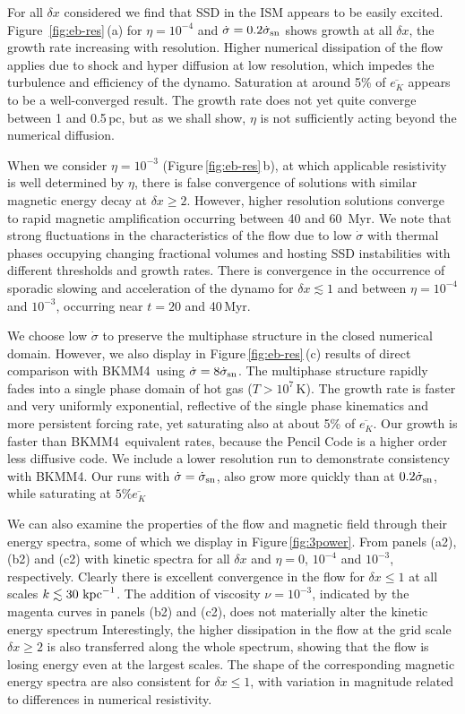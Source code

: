 \documentclass[preprint2]{aastex63}
\newcommand\SNr{\dot\sigma_{\rm sn}}
\newcommand\kpc{~ {\rm kpc}}
\newcommand\dx{ {\delta x}}
\newcommand\BKM{{\sf BKMM4}}
\newcommand{\fg}[1]{\textcolor{midgreen}{#1}}
\begin{document}
\fg{For all $\dx$ considered we find that SSD in the
 ISM appears to be easily excited.
 Figure~\ref{fig:eb-res}\,(a) for $\eta=10^{-4}$ and $\dot\sigma=0.2\SNr$
 shows growth at all $\dx$, the growth rate increasing with resolution.
 Higher numerical dissipation of the flow applies due to shock and hyper
 diffusion at low resolution, which impedes the turbulence and efficiency of
 the dynamo.
 Saturation at around 5\% of $\overline{e_K}$ appears to be a well-converged
 result.
 The growth rate does not yet quite converge between 1 and 0.5\,pc, but as we
 shall show, $\eta$ is not sufficiently acting beyond the numerical diffusion.}

 \fg{When we consider} $\eta=10^{-3}$ \fg{(Figure\,\ref{fig:eb-res}\,b), at which
 applicable resistivity is well determined by $\eta$,} there is false
 convergence
 \citep{FMA91} of solutions with similar magnetic energy decay at $\dx\geq2$.
 However, higher resolution solutions converge to rapid magnetic
 amplification occurring between 40 and 60~Myr.
 \fg{We note that strong fluctuations in the characteristics of the flow due to
 low $\dot\sigma$ with thermal phases occupying changing fractional volumes
 \citep[e.g.][]{gatto2015} and hosting SSD instabilities with different 
 thresholds and growth rates.
 There is convergence in the occurrence of sporadic slowing and acceleration
 of the dynamo for $\dx\lesssim1$ and between $\eta=10^{-4}$ and $10^{-3}$,
 occurring near $t=20$ and 40\,Myr.
 }
  
 \fg{We choose low $\dot\sigma$ to preserve the multiphase structure in the 
 closed numerical domain. 
 However, we also display in Figure\,\ref{fig:eb-res}\,(c) results of direct
 comparison with \BKM\ using $\dot\sigma=8\SNr$.
 The multiphase structure rapidly fades into a single phase domain of hot gas
 ($T>10^7$\,K).
 The growth rate is faster and very uniformly exponential, reflective of the
 single phase kinematics and more persistent forcing rate, yet saturating
 also at about 5\% of $\overline{e_K}$.
 Our growth is faster than \BKM\ equivalent rates, because the Pencil Code is a
 higher order less diffusive code.
 We include a lower resolution run to demonstrate consistency with \BKM.
 Our runs with $\dot\sigma=\SNr$, also grow more quickly than at $0.2\SNr$,
 while saturating at $5\%\overline{e_K}$}%

 \fg{We can also examine the properties of the flow and magnetic field through
 their energy spectra, some of which we display in Figure\,\ref{fig:3power}.
 From panels (a2), (b2) and (c2) with kinetic spectra for all $\dx$ and 
 $\eta=0$, $10^{-4}$ and $10^{-3}$, respectively.
 Clearly there is excellent convergence in the flow for $\dx\leq1$ at all
 scales $k\lesssim 30\kpc^{-1}$.
 The addition of viscosity $\nu=10^{-3}$, indicated by the magenta curves in
 panels (b2) and (c2), does not materially alter the kinetic energy spectrum
 Interestingly, the higher dissipation in the flow at the grid scale 
 $\dx\geq2$ is also transferred along the whole spectrum, showing that
 the flow is losing energy even at the largest scales.
 The shape of the corresponding magnetic energy spectra are also consistent 
 for $\dx\leq1$, with variation in magnitude related to differences in
 numerical resistivity.
}
 
\end{document}
